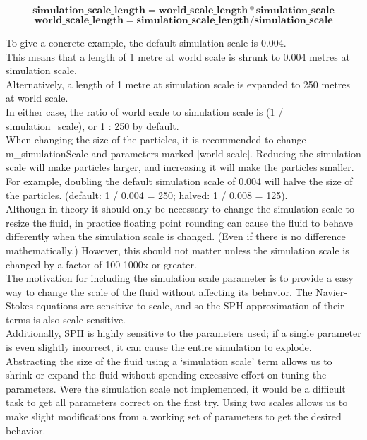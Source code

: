 \documentclass[]{article}
\begin{document}
			\[ \mathbf{simulation\_scale\_length = world\_scale\_length * simulation\_scale} \]
			\[ \mathbf{world\_scale\_length = simulation\_scale\_length / simulation\_scale} \]
			
			To give a concrete example, the default simulation scale is 0.004.\\
			This means that a length of 1 metre at world scale is shrunk to 0.004 metres at simulation scale.\\
			Alternatively, a length of 1 metre at simulation scale is expanded to 250 metres at world scale.\\
			In either case, the ratio of world scale to simulation scale is (1 / simulation\_scale), or 1 : 250 by default.\\
			
			When changing the size of the particles, it is recommended to change m\_simulationScale and parameters 
			marked [world scale]. Reducing the simulation scale will make particles larger, and increasing it will 
			make the particles smaller. For example, doubling the default simulation scale of 0.004 will halve the 
			size of the particles. (default: 1 / 0.004 = 250; halved: 1 / 0.008 = 125).\\
			
			Although in theory it should only be necessary to change the simulation scale to resize the fluid, in practice
			floating point rounding can cause the fluid to behave differently when the simulation scale is changed. (Even if
			there is no difference mathematically.) However, this should not matter unless the simulation scale is changed by
			a factor of 100-1000x or greater.\\
			
			The motivation for including the simulation scale parameter is to provide a easy way to change the scale of
			the fluid without affecting its behavior. The Navier-Stokes equations are sensitive to scale, and so the SPH
			approximation of their terms is also scale sensitive.\\
			
			Additionally, SPH is highly sensitive to the parameters used; if a single parameter is even slightly incorrect, 
			it can cause the entire simulation to explode. Abstracting the size of the fluid using a `simulation scale' term
			allows us to shrink or expand the fluid without spending excessive effort on tuning the parameters. Were the 
			simulation scale not implemented, it would be a difficult task to get all parameters correct on the first try. 
			Using two scales allows us to make slight modifications from a working set of parameters to get the desired 
			behavior.\\
			
\end{document}
